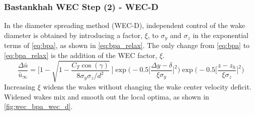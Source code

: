 \documentclass{jpconf}
\begin{document}
\subsubsection{Bastankhah WEC Step (2) - WEC-D}
In the diameter spreading method (WEC-D), independent control of the wake diameter is obtained by introducing a factor, $\xi$, to $\sigma_y$ and $\sigma_z$ in the exponential terms of \cref{eq:bpa}, as shown in \cref{eq:bpa_relax}. The only change from \cref{eq:bpa} to \cref{eq:bpa_relax} is the addition of the WEC factor, $\xi$.
\begin{equation}
	\frac{\Delta \bar{u}}{\bar{u}_{\infty}} = \Bigg[1-\sqrt{1-\frac{C_T \cos{(\gamma)}}{8 \sigma_y \sigma_z/d^2}}~\Bigg] \exp{\bigg(-0.5\Big[\frac{\Delta y-\delta}{\xi \sigma_y}\Big]^2\bigg)}\exp{\bigg(-0.5\Big[\frac{z-z_h}{\xi \sigma_z}\Big]^2\bigg)}
	\label{eq:bpa_relax}
\end{equation}
Increasing $\xi$ widens the wakes without changing the wake center velocity deficit. Widened wakes mix and smooth out the local optima, as shown in \cref{fig:wec_bpa_wec_d}. 
%
\end{document}
